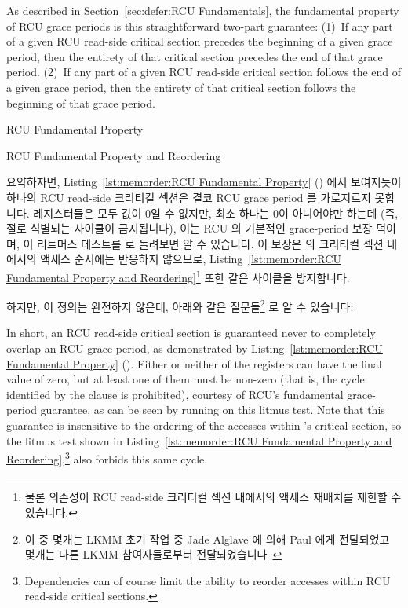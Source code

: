 As described in
Section~\ref{sec:defer:RCU Fundamentals},
the fundamental property of RCU grace periods is this straightforward
two-part guarantee:
(1)~If any part of a given RCU read-side critical section precedes
the beginning of a given grace period, then the entirety of that
critical section precedes the end of that grace period.
(2)~If any part of a given RCU read-side critical section follows
the end of a given grace period, then the entirety of that
critical section follows the beginning of that grace period.
\fi

\begin{listing}[tb]

\caption{RCU Fundamental Property}
\label{lst:memorder:RCU Fundamental Property}
\end{listing}

\begin{listing}[tb]

\caption{RCU Fundamental Property and Reordering}
\label{lst:memorder:RCU Fundamental Property and Reordering}
\end{listing}

요약하자면,
Listing~\ref{lst:memorder:RCU Fundamental Property}
() 에서 보여지듯이 하나의 RCU
read-side 크리티컬 섹션은 결코 RCU grace period 를 가로지르지 못합니다.
 레지스터들은 모두 값이 0일 수 없지만, 최소 하나는 0이 아니어야만 하는데
(즉,  절로 식별되는 사이클이 금지됩니다), 이는 RCU 의 기본적인
grace-period 보장 덕이며, 이 리트머스 테스트를  로 돌려보면 알 수
있습니다.
이 보장은  의 크리티컬 섹션 내에서의 액세스 순서에는 반응하지
않으므로,
Listing~\ref{lst:memorder:RCU Fundamental Property and Reordering}\footnote{
	물론 의존성이 RCU read-side 크리티컬 섹션 내에서의 액세스 재배치를
	제한할 수 있습니다.}
또한 같은 사이클을 방지합니다.

하지만, 이 정의는 완전하지 않은데, 아래와 같은 질문들\footnote{
	이 중 몇개는 LKMM 초기 작업 중 Jade Alglave 에 의해 Paul 에게
	전달되었고 몇개는 다른 LKMM 참여자들로부터
	전달되었습니다~\cite{Alglave:2018:FSC:3173162.3177156}}
로 알 수 있습니다:
\iffalse

In short, an RCU read-side critical section is guaranteed never to
completely overlap an RCU grace period, as demonstrated by
Listing~\ref{lst:memorder:RCU Fundamental Property}
().
Either or neither of the  registers can have the final value of zero,
but at least one of them must be non-zero (that is, the cycle identified
by the  clause is prohibited), courtesy of RCU's fundamental
grace-period guarantee, as can be seen by running  on this litmus test.
Note that this guarantee is insensitive to the ordering of the accesses
within 's critical section, so the litmus test shown in
Listing~\ref{lst:memorder:RCU Fundamental Property and Reordering},\footnote{
	Dependencies can of course limit the ability to reorder accesses
	within RCU read-side critical sections.}
also forbids this same cycle.

